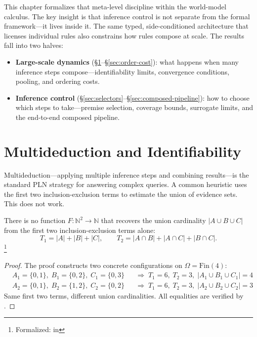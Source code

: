 \documentclass[11pt,openany]{report}
\begin{document}
This chapter formalizes that meta-level discipline within the
world-model calculus.  The key insight is that inference control is
not separate from the formal framework---it lives inside it.  The
same typed, side-conditioned architecture that licenses individual
rules also constrains how rules compose at scale.  The results fall
into two halves:

\begin{itemize}
\item \textbf{Large-scale dynamics} (\S\ref{sec:multideduction}--\S\ref{sec:order-cost}): what happens when
  many inference steps compose---identifiability limits,
  convergence conditions, pooling, and ordering costs.
\item \textbf{Inference control}
  (\S\ref{sec:selectors}--\S\ref{sec:composed-pipeline}): how to
  choose which steps to take---premise selection, coverage bounds,
  surrogate limits, and the end-to-end composed pipeline.
\end{itemize}




\section{Multideduction and Identifiability}
\label{sec:multideduction}

Multideduction---applying multiple inference steps and combining
results---is the standard PLN strategy for answering complex queries.
A common heuristic uses the first two inclusion-exclusion terms to
estimate the union of evidence sets.  This does not work.

\begin{theorem}
\label{thm:ie-no-go}
There is no function $F : \mathbb{N}^2 \to \mathbb{N}$ that recovers
the union cardinality $|A \cup B \cup C|$ from the first two
inclusion-exclusion terms alone:
\[
  T_1 = |A| + |B| + |C|, \qquad
  T_2 = |A \cap B| + |A \cap C| + |B \cap C|.
\]%
\footnote{Formalized:
in 
}
\end{theorem}

\begin{proof}[Proof]
The proof constructs two concrete configurations on
$\Omega = \mathrm{Fin}(4)$:
\begin{align*}
  &A_1 = \{0,1\},\; B_1 = \{0,2\},\; C_1 = \{0,3\}
    &&\Longrightarrow\; T_1 = 6,\; T_2 = 3,\; |A_1 \cup B_1 \cup C_1| = 4 \\
  &A_2 = \{0,1\},\; B_2 = \{1,2\},\; C_2 = \{0,2\}
    &&\Longrightarrow\; T_1 = 6,\; T_2 = 3,\; |A_2 \cup B_2 \cup C_2| = 3
\end{align*}
Same first two terms, different union cardinalities.  All equalities
are verified by .
\end{proof}
\end{document}
